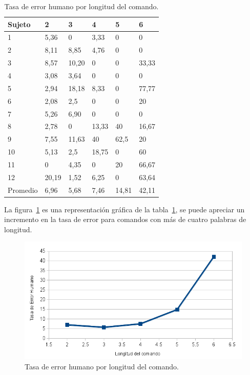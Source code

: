 \begin{table}[H]
\centering
\footnotesize
\begin{tabular}{|p{1.6cm}|p{1.6cm}|p{1.6cm}|p{1.6cm}|p{1.6cm}|p{1.6cm}|}
\hline
    Sujeto & 2 & 3 & 4 & 5 & 6  \\
    \hline 
    1 & 5,36   & 0     & 3,33  &0   &0 \\
    2 & 8,11   & 8,85  & 4,76  &0   &0 \\
    3 & 8,57   & 10,20 & 0 &  0  &33,33 \\
    4 & 3,08   & 3,64 & 0  & 0  & 0 \\
    5 & 2,94   & 18,18 & 8,33 &  0 & 77,77 \\
    6 & 2,08   & 2,5 & 0 & 0 & 20 \\
    7 & 5,26   & 6,90 & 0 & 0 & 0 \\
    8 & 2,78   & 0 & 13,33 & 40 & 16,67 \\
    9 & 7,55   & 11,63 & 40  &  62,5  & 20 \\
    10 & 5,13  & 2,5  & 18,75  &  0 & 60 \\
    11 & 0     & 4,35 & 0 & 20 & 66,67 \\
    12 & 20,19 & 1,52 & 6,25 & 0  & 63,64 \\
    \hline 
    Promedio & 6,96 & 5,68 & 7,46 & 14,81 & 42,11 \\
\hline
\end{tabular}
\caption{Tasa de error humano por longitud del comando.}
\label{sec:error-longitud}
\end{table}

La figura~\ref{sec:grafico-error-longitud} es una representaci\'on gr\'afica de la tabla~\ref{sec:error-longitud},
se puede apreciar un incremento en la tasa de error para comandos con m\'as de cuatro palabras de longitud.

\begin{figure}[H]
\centering
\includegraphics[width=0.7\linewidth]{./graphics/longitud-error.png}
\caption{Tasa de error humano por longitud del comando.}
\label{sec:grafico-error-longitud}
\end{figure}

